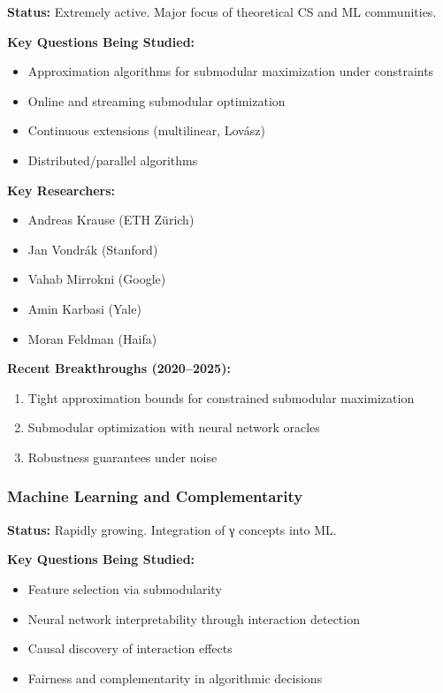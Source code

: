 \textbf{Status:} Extremely active. Major focus of theoretical CS and ML communities.

\textbf{Key Questions Being Studied:}
\begin{itemize}[noitemsep]
    \item Approximation algorithms for submodular maximization under constraints
    \item Online and streaming submodular optimization
    \item Continuous extensions (multilinear, Lovász)
    \item Distributed/parallel algorithms
\end{itemize}

\textbf{Key Researchers:}
\begin{itemize}[noitemsep]
    \item Andreas Krause (ETH Zürich)
    \item Jan Vondrák (Stanford)
    \item Vahab Mirrokni (Google)
    \item Amin Karbasi (Yale)
    \item Moran Feldman (Haifa)
\end{itemize}

\textbf{Recent Breakthroughs (2020--2025):}
\begin{enumerate}[noitemsep]
    \item Tight approximation bounds for constrained submodular maximization
    \item Submodular optimization with neural network oracles
    \item Robustness guarantees under noise
\end{enumerate}

\subsubsection{Machine Learning and Complementarity}

\textbf{Status:} Rapidly growing. Integration of γ concepts into ML.

\textbf{Key Questions Being Studied:}
\begin{itemize}[noitemsep]
    \item Feature selection via submodularity
    \item Neural network interpretability through interaction detection
    \item Causal discovery of interaction effects
    \item Fairness and complementarity in algorithmic decisions
\end{itemize}

